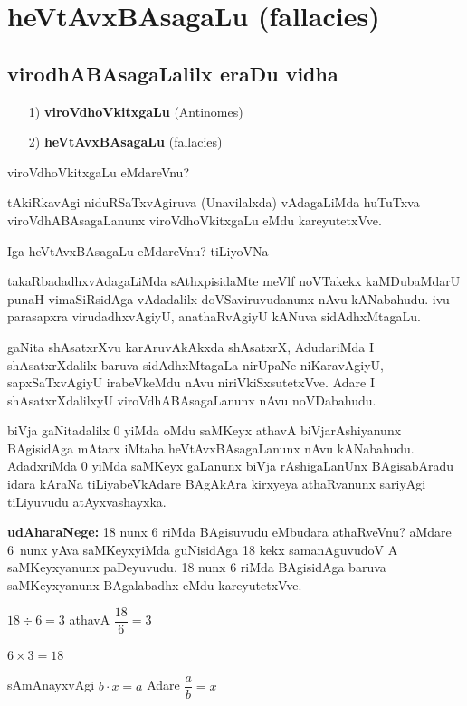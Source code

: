 \chapter{heVtAvxBAsagaLu {\rm (fallacies)}}

\section*{virodhABAsagaLalilx eraDu vidha}

\begin{itemize}
\item[{\rm 1)}] {\bf viroVdhoVkitxgaLu} {\rm (Antinomes)}
\item[{\rm 2)}] {\bf heVtAvxBAsagaLu} {\rm (fallacies)}
\end{itemize}

viroVdhoVkitxgaLu eMdareVnu?

tAkiRkavAgi niduRSaTxvAgiruva (Unavilalxda) vAdagaLiMda huTuTxva viroVdhA\-BAsagaLanunx viroVdhoVkitxgaLu eMdu kareyutetxVve.

Iga heVtAvxBAsagaLu eMdareVnu? tiLiyoVNa

takaRbadadhxvAdagaLiMda sAthxpisidaMte meVlf noVTakekx kaMDubaMdarU punaH vimaSiRsidAga vAdadalilx doVSaviruvudanunx nAvu kANabahudu. ivu parasapxra virudadhxvAgiyU, anathaRvAgiyU kANuva sidAdhxMtagaLu.

gaNita shAsatxrXvu karAruvAkAkxda shAsatxrX, AdudariMda I shAsatxrXdalilx baruva sidAdhxMta\-gaLa nirUpaNe niKaravAgiyU, sapxSaTxvAgiyU irabeVkeMdu nAvu niriVkiSxsutetxVve. Adare I shAsatxrXdalilxyU viroVdhABAsagaLanunx nAvu noVDabahudu.

biVja gaNitadalilx {\rm 0} yiMda oMdu saMKeyx athavA biVjarAshiyanunx BAgisidAga mAtarx iMtaha heVtAvxBAsagaLanunx nAvu kANabahudu. AdadxriMda {\rm 0} yiMda saMKeyx gaLanunx biVja rAshigaLanUnx BAgisabAradu idara kAraNa tiLiyabeVkAdare BAgAkAra kirxyeya athaRvanunx sariyAgi tiLiyuvudu atAyxvashayxka.

\textbf{udAharaNege:} {\rm 18} nunx {\rm 6} riMda BAgisuvudu eMbudara athaRveVnu? aMdare {\rm 6}~nunx yAva saMKeyxyiMda guNisidAga {\rm 18} kekx samanAguvudoV A saMKeyxyanunx paDeyuvudu. {\rm 18} nunx {\rm 6} riMda BAgisidAga baruva saMKeyxyanunx BAgalabadhx eMdu kareyutetxVve.
\begin{center}
$18\div 6=3$ \quad athavA \quad $\dfrac{18}{6}=3$

$6\times3=18$

sAmAnayxvAgi \quad $b\cdot x=a$ \quad Adare \quad $\dfrac{a}{b}=x$
\end{center}

